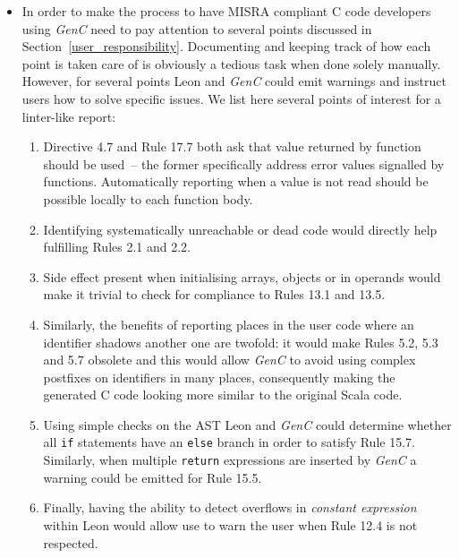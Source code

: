 \documentclass[a4paper,twoside]{article}
\newcommand{\InlineC}[1]{\lstinline[language=C99]|#1|}
\newcommand{\InlineS}[1]{\lstinline[language=Leon]|#1|}
\newcommand{\GenC}{\emph{GenC}\xspace}
\newcommand{\RefSec}[1]{Section~\ref{#1}}
\begin{document}
\begin{itemize}
\begin{ShortCode}{C99}
static void update(A* a) {
  updateB((B_ref) { .a = a });
  /* no copy:            ^  */
}
\end{ShortCode}

Such modification of the type translation and representation however would
require a full analysis, assessing notably if the augmentation of types and type
conversions impacts the generated C99 code in an undesirable way. Moreover, the
impact of the relaxed aliasing rules described above should be taken into
account when solving this limitation.

\item In order to make the process to have MISRA compliant C code developers
using \GenC need to pay attention to several points discussed in
\RefSec{user_responsibility}. Documenting and keeping track of how each point is
taken care of is obviously a tedious task when done solely manually. However,
for several points Leon and \GenC could emit warnings and instruct users how to
solve specific issues. We list here several points of interest for a linter-like
report:

  \begin{enumerate}

  \item Directive 4.7 and Rule 17.7 both ask that value returned by function
  should be used~-- the former specifically address error values signalled by
  functions. Automatically reporting when a value is not read should be possible
  locally to each function body.

  \item Identifying systematically unreachable or dead code would directly help
  fulfilling Rules 2.1 and 2.2.

  \item Side effect present when initialising arrays, objects or in operands
  would make it trivial to check for compliance to Rules 13.1 and 13.5.

  \item Similarly, the benefits of reporting places in the user code where an
  identifier shadows another one are twofold: it would make Rules 5.2, 5.3 and
  5.7 obsolete and this would allow \GenC to avoid using complex postfixes on
  identifiers in many places, consequently making the generated C code looking
  more similar to the original Scala code.

  \item Using simple checks on the AST Leon and \GenC could determine whether
  all \InlineS{if} statements have an \InlineS{else} branch in order to satisfy
  Rule 15.7. Similarly, when multiple \InlineC{return} expressions are inserted
  by \GenC a warning could be emitted for Rule 15.5.

  \item Finally, having the ability to detect overflows in \emph{constant
  expression} within Leon would allow use to warn the user when Rule 12.4 is not
  respected.

  \end{enumerate}

\end{itemize}
\end{document}
